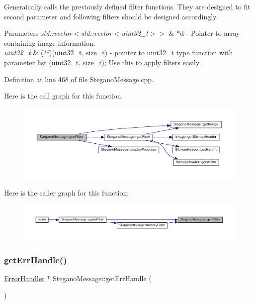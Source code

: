 Generaically calls the previously defined filter functions. They are designed to fit second parameter and following filters should be designed accordingly. 


\begin{DoxyParams}{Parameters}
{\em std\+::vector$<$std\+::vector$<$uint32\+\_\+t$>$$>$} & $\ast$d -\/ Pointer to array containing image information. \\
\hline
{\em uint32\+\_\+t} & ($\ast$f)(uint32\+\_\+t, size\+\_\+t) -\/ pointer to uint32\+\_\+t type function with parameter list (uint32\+\_\+t, size\+\_\+t); Use this to apply filters easily. \\
\hline
\end{DoxyParams}


Definition at line 468 of file Stegano\+Message.\+cpp.

Here is the call graph for this function\+:
\nopagebreak
\begin{figure}[H]
\begin{center}
\leavevmode
\includegraphics[width=350pt]{classSteganoMessage_a1cb326688e9a054127396d198bd6f976_cgraph}
\end{center}
\end{figure}
Here is the caller graph for this function\+:
\nopagebreak
\begin{figure}[H]
\begin{center}
\leavevmode
\includegraphics[width=350pt]{classSteganoMessage_a1cb326688e9a054127396d198bd6f976_icgraph}
\end{center}
\end{figure}
\mbox{\label{classSteganoMessage_a0134757a8c79caa9dca9bcce0686d1ef}} 
\subsubsection{\texorpdfstring{getErrHandle()}{getErrHandle()}}
{\footnotesize\ttfamily \mbox{\hyperlink{classErrorHandler}{Error\+Handler}} $\ast$ Stegano\+Message\+::get\+Err\+Handle (\begin{DoxyParamCaption}{ }\end{DoxyParamCaption})}



